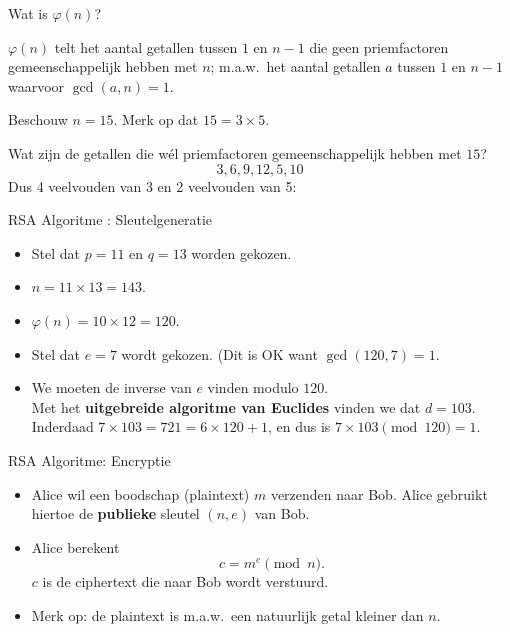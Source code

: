 \documentclass{beamer}
\begin{document}
\begin{frame}{Wat is $\varphi(n)$?}

$\varphi(n)$ telt het aantal getallen tussen $1$ en $n-1$ die geen priemfactoren gemeenschappelijk
hebben met $n$; m.a.w.\ het aantal getallen $a$ tussen $1$ en $n-1$ waarvoor $\gcd(a, n) = 1$.

\vspace{0.5cm}
Beschouw $ n = 15$. Merk op dat $ 15 = 3 \times 5$.

Wat zijn de getallen die w\'el priemfactoren gemeenschappelijk hebben met $15$?
\[
3, 6 , 9, 12, 5, 10
\]
Dus 4 veelvouden van 3 en 2 veelvouden van 5: 


\end{frame}


%		

\begin{frame}{RSA Algoritme : Sleutelgeneratie}

\begin{itemize}
	\item Stel dat $p = 11$ en $q = 13$ worden gekozen.
	\item $ n = 11 \times 13 = 143$.
	\item $\varphi(n) = 10 \times 12 = 120$.
	\item Stel dat $e = 7$ wordt gekozen. (Dit is OK want $\gcd(120, 7) = 1$.
	\item We moeten de inverse van $e$ vinden modulo $120$. \\
	 Met het \textbf{uitgebreide algoritme van Euclides} vinden we dat $d = 103$.\\
	 Inderdaad $ 7 \times 103 = 721 = 6 \times 120 + 1$, en dus is 
	 $7 \times 103 \pmod{120} = 1$.
	  
\end{itemize}
\end{frame}

\begin{frame}{RSA Algoritme: Encryptie}
\begin{itemize}
	\item Alice wil een boodschap (plaintext) $m$ verzenden naar Bob. Alice gebruikt hiertoe de \textbf{publieke} sleutel $(n, e)$ van Bob.
	\item Alice berekent
	\[
	 c = m^e \pmod{n}.
	\]
	$c$ is de ciphertext die naar Bob wordt verstuurd.
	\item Merk op: de plaintext is m.a.w.\ een natuurlijk getal
	kleiner dan $n$.
\end{itemize}
\end{frame}
\end{document}
